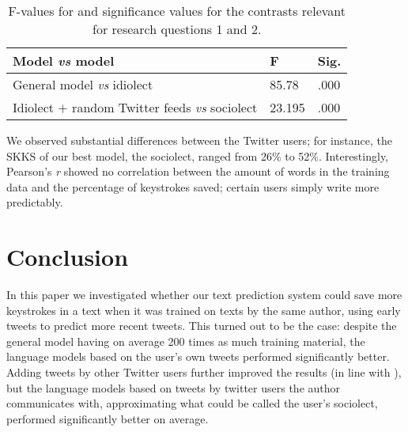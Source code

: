 \documentclass[11pt]{article}
\begin{document}
\begin{table}[htb]
\begin{center}
\begin{tabular}{p{4.5cm}|ll} 
Model \emph{vs} model & F & Sig.\\
\hline 
General model \emph{vs} idiolect & 85.78 & .000\\ 
Idiolect $+$ random Twitter feeds \emph{vs} sociolect & 23.195 & .000\\
\end{tabular}
\caption{F-values for and significance values for the contrasts relevant for research questions 1 and 2.}
\label{stat}
\end{center}
\end{table}

We observed substantial differences between the Twitter users; for instance, the SKKS of our best model, the sociolect, ranged from 26\% to 52\%. Interestingly, Pearson's \emph{r} showed no correlation between the amount of words in the training data and the percentage of keystrokes saved; certain users simply write more predictably.

\section{Conclusion}
In this paper we investigated whether our text prediction system could save more keystrokes in a text when it was trained on texts by the same author, using early tweets to predict more recent tweets. This turned out to be the case: despite the general model having on average 200 times as much training material, the language models based on the user's own tweets performed significantly better. Adding tweets by other Twitter users further improved the results (in line with \cite{verberne12}), but the language models based on tweets by twitter users the author communicates with, approximating what could be called the user's sociolect, performed significantly better on average.



\end{document}
